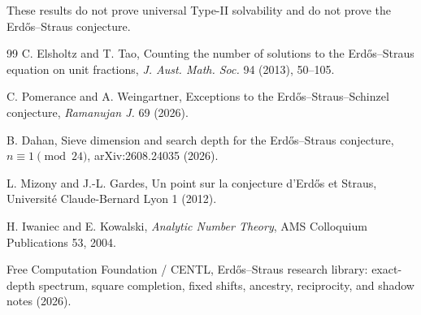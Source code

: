 \documentclass[11pt]{article}
\theoremstyle{definition}
\begin{document}
These results do not prove universal Type-II solvability and do not prove the Erd\H{o}s--Straus conjecture.

\begin{thebibliography}{99}
C. Elsholtz and T. Tao,
Counting the number of solutions to the Erd\H{o}s--Straus equation on unit fractions,
\emph{J. Aust. Math. Soc.} 94 (2013), 50--105.

C. Pomerance and A. Weingartner,
Exceptions to the Erd\H{o}s--Straus--Schinzel conjecture,
\emph{Ramanujan J.} 69 (2026).

B. Dahan,
Sieve dimension and search depth for the Erd\H{o}s--Straus conjecture, $n\equiv1\pmod{24}$,
arXiv:2608.24035 (2026).

L. Mizony and J.-L. Gardes,
Un point sur la conjecture d'Erd\H{o}s et Straus,
Universit\'e Claude-Bernard Lyon 1 (2012).

H. Iwaniec and E. Kowalski,
\emph{Analytic Number Theory},
AMS Colloquium Publications 53, 2004.

Free Computation Foundation / CENTL,
Erd\H{o}s--Straus research library: exact-depth spectrum, square completion, fixed shifts, ancestry, reciprocity, and shadow notes (2026).
\end{thebibliography}
\end{document}
